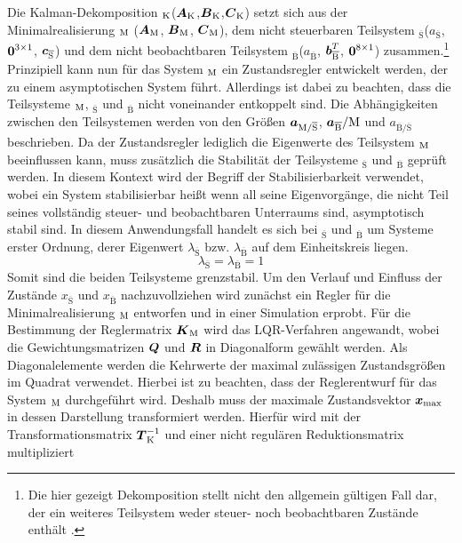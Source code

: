 Die Kalman-Dekomposition $_{\text{K}}$($\boldsymbol{A}_{\text{K}}$,$\boldsymbol{B}_{\text{K}}$,$\boldsymbol{C}_{\text{K}}$) setzt sich aus der Minimalrealisierung $_{\text{M}}$ ($\boldsymbol{A}_{\text{M}}$, $\boldsymbol{B}_{\text{M}}$, $\boldsymbol{C}_{\text{M}}$), dem nicht steuerbaren Teilsystem $_{\overline{\text{S}}}$($a_{\overline{\text{S}}}$, $\boldsymbol{0}^{3\times 1}$, $\boldsymbol{c}_{\overline{\text{S}}}$) und dem nicht beobachtbaren Teilsystem $_{\overline{\text{B}}}$($a_{\overline{\text{B}}}$, $\boldsymbol{b}^T_{\overline{\text{B}}}$, $\boldsymbol{0}^{8\times 1}$) zusammen.\footnote{Die hier gezeigt Dekomposition stellt nicht den allgemein gültigen Fall dar, der ein weiteres Teilsystem weder steuer- noch beobachtbaren Zustände enthält \cite[S. 108 ff.]{LunzeRT2}.} Prinzipiell kann nun für das System $_{\text{M}}$ ein Zustandsregler entwickelt werden, der zu einem asymptotischen System führt. Allerdings ist dabei zu beachten, dass die Teilsysteme $_{\text{M}}$, $_{\overline{\text{S}}}$ und $_{\overline{\text{B}}}$ nicht voneinander entkoppelt sind. Die Abhängigkeiten zwischen den Teilsystemen werden von den Größen $\boldsymbol{a}_{\text{M}/\overline{\text{S}}}$, $\boldsymbol{a}_{\overline{\text{B}}}/\text{M}$ und $a_{\overline{\text{B}}/\overline{\text{S}}}$ beschrieben. Da der Zustandsregler lediglich die Eigenwerte des Teilsystem $_{\text{M}}$ beeinflussen kann, muss zusätzlich die Stabilität der Teilsysteme $_{\overline{\text{S}}}$ und $_{\overline{\text{B}}}$ geprüft werden. In diesem Kontext wird der Begriff der Stabilisierbarkeit verwendet, wobei ein System stabilisierbar heißt wenn all seine Eigenvorgänge, die nicht Teil seines vollständig steuer- und beobachtbaren Unterraums sind, asymptotisch stabil sind. In diesem Anwendungsfall handelt es sich bei $_{\overline{\text{S}}}$ und $_{\overline{\text{B}}}$ um Systeme erster Ordnung, derer Eigenwert $\lambda_{\overline{\text{S}}}$ bzw. $\lambda_{\overline{\text{B}}}$ auf dem Einheitskreis liegen.
\begin{equation}
\lambda_{\overline{\text{S}}} = \lambda_{\overline{\text{B}}} = 1
\end{equation}
Somit sind die beiden Teilsysteme grenzstabil. Um den Verlauf und Einfluss der Zustände $x_{\overline{\text{S}}}$ und $x_{\overline{\text{B}}}$ nachzuvollziehen wird zunächst ein Regler für die Minimalrealisierung $_{\text{M}}$ entworfen und in einer Simulation erprobt. Für die Bestimmung der Reglermatrix $\boldsymbol{K}_{\text{M}}$ wird das LQR-Verfahren angewandt, wobei die Gewichtungsmatrizen $\boldsymbol{Q}$ und $\boldsymbol{R}$ in Diagonalform gewählt werden. Als Diagonalelemente werden die Kehrwerte der maximal zulässigen Zustandsgrößen im Quadrat verwendet. Hierbei ist zu beachten, dass der Reglerentwurf für das System $_{\text{M}}$ durchgeführt wird. Deshalb muss der maximale Zustandsvektor $\boldsymbol{x}_{\text{max}}$ in dessen Darstellung transformiert werden. Hierfür wird mit der Transformationsmatrix $\boldsymbol{T}^{-1}_{\text{K}}$ und einer nicht regulären Reduktionsmatrix multipliziert
